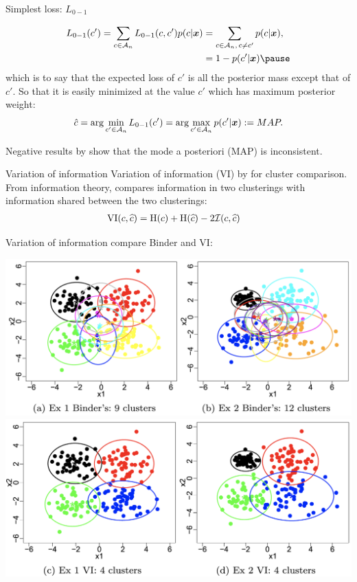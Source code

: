 \begin{frame}{Simplest loss: $L_{0-1}$}

\begin{align*}
	L_{0-1}(c') = \sum_{c\in\Ac_n} L_{0-1}(c,c')p(c|\bx) &= \sum_{c\in\Ac_n,\,c\neq c'} p(c|\bx),\\
	& = 1 - p(c'|\bx)\pause
\end{align*}
which is to say that the expected loss of $c'$ is \alert{all the posterior mass except that of $c'$.} So that it is easily minimized at the value $c'$ which has \alert{maximum} posterior weight:
$$\hat c =  \arg \min_{c' \in \mathcal{A}_n} L_{0-1}(c') =   \arg \max_{c' \in \mathcal{A}_n} p(c'|\boldsymbol{x}):= MAP.$$\pause

Negative results by \citet{rajkowski2019analysis} show that the \alert{mode a posteriori (MAP) is inconsistent}.
	
\end{frame}

\begin{frame}{Variation of information}
\alert{Variation of information} (VI) by \citet{meila2007comparing} for cluster comparison. From information theory, compares information in two clusterings with information shared between the two clusterings:
\begin{align*}
&\text{VI}(c,\widehat{c})=\text{H}(c)+\text{H}(\widehat{c})-2\mathcal{I}(c,\widehat{c})
\end{align*}
\end{frame}


\begin{frame}{Variation of information}
\citet{wade2018bayesian} 
compare Binder and VI:\bigskip

\begin{center}
\includegraphics[width=.7\textwidth]{figures_julyan/mixtures/wade_example_binder}
\includegraphics[width=.7\textwidth]{figures_julyan/mixtures/wade_example_VI}	
\end{center}
\end{frame}


